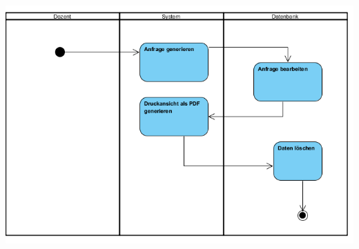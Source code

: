 \documentclass{article}
\begin{document}
\begin{center}
\includegraphics[scale=1]{bilder/Belegarbeit_archivieren_Activity.png}\\


\end{center}
\end{document}
